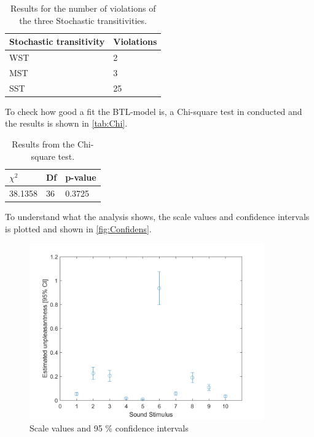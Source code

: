 \begin{table}[H]
\centering
\begin{tabular}{@{}ll@{}}
\toprule
Stochastic transitivity     & Violations \\ \midrule
WST      & 2   \\
MST      & 3   \\
SST      & 25   \\ \bottomrule
\end{tabular}
\caption{Results for the number of violations of the three Stochastic transitivities.}
\label{tab:Stocha}
\end{table} 

\noindent To check how good a fit the BTL-model is, a Chi-square test in conducted and the results is shown in \autoref{tab:Chi}. 

\begin{table}[H]
\centering
\begin{tabular}{@{}lll@{}}
\toprule
$\chi^{2}$     & Df & p-value \\ \midrule
38.1358      & 36  &  0.3725   \\ \bottomrule
\end{tabular}
\caption{Results from the Chi-square test.}
\label{tab:Chi}
\end{table} 

\noindent To understand what the analysis shows, the scale values and confidence intervals is plotted and shown in \autoref{fig:Confidens}. 

\begin{figure}[H]
\centering
\includegraphics[width = 0.90\textwidth]{Figure/Confidens.png} 
\caption{Scale values and 95 \% confidence intervals}
\label{fig:Confidens}
\end{figure}